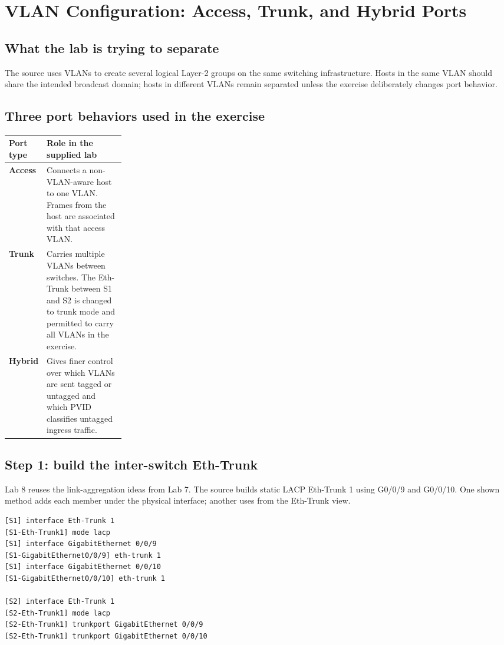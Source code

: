 \chapter{VLAN Configuration: Access, Trunk, and Hybrid Ports}

\section{What the lab is trying to separate}
The source uses VLANs to create several logical Layer-2 groups on the same switching infrastructure. Hosts in the same VLAN should share the intended broadcast domain; hosts in different VLANs remain separated unless the exercise deliberately changes port behavior.


\section{Three port behaviors used in the exercise}
\begin{tabularx}{\linewidth}{>{\bfseries}p{0.23\linewidth}X}
\toprule
Port type & Role in the supplied lab\\\midrule
Access & Connects a non-VLAN-aware host to one VLAN. Frames from the host are associated with that access VLAN.\\
Trunk & Carries multiple VLANs between switches. The Eth-Trunk between S1 and S2 is changed to trunk mode and permitted to carry all VLANs in the exercise.\\
Hybrid & Gives finer control over which VLANs are sent tagged or untagged and which PVID classifies untagged ingress traffic.\\\bottomrule
\end{tabularx}

\section{Step 1: build the inter-switch Eth-Trunk}
Lab 8 reuses the link-aggregation ideas from Lab 7. The source builds static LACP Eth-Trunk 1 using G0/0/9 and G0/0/10. One shown method adds each member under the physical interface; another uses  from the Eth-Trunk view.
\begin{lstlisting}[style=dcnterminal]
[S1] interface Eth-Trunk 1
[S1-Eth-Trunk1] mode lacp
[S1] interface GigabitEthernet 0/0/9
[S1-GigabitEthernet0/0/9] eth-trunk 1
[S1] interface GigabitEthernet 0/0/10
[S1-GigabitEthernet0/0/10] eth-trunk 1

[S2] interface Eth-Trunk 1
[S2-Eth-Trunk1] mode lacp
[S2-Eth-Trunk1] trunkport GigabitEthernet 0/0/9
[S2-Eth-Trunk1] trunkport GigabitEthernet 0/0/10
\end{lstlisting}

